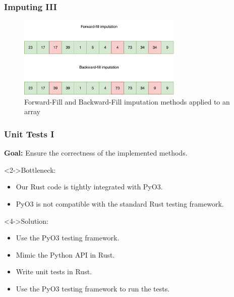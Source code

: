 \documentclass[t,english]{beamer}
\begin{document}
\begin{frame}
  \frametitle{Imputing III}
    \begin{figure}[H]
        \includegraphics[width=0.7\textwidth]{figures/imputing/imputation_2.png}
        \caption{Forward-Fill and Backward-Fill imputation methods applied to an array}
        \label{fig:imputing}
    \end{figure}
\end{frame}

\begin{frame}
  \frametitle{Unit Tests I}
  \textbf{Goal:} Ensure the correctness of the implemented methods.

  \begin{block}<2->{Bottleneck:}
    \begin{itemize}
      \item <2-> Our Rust code is tightly integrated with PyO3.
      \item <3-> PyO3 is not compatible with the standard Rust testing framework.
    \end{itemize}
  \end{block}

  \begin{block}<4->{Solution:}
    \begin{itemize}
      \item <4-> Use the PyO3 testing framework.
      \item <5-> Mimic the Python API in Rust.
      \item <6-> Write unit tests in Rust.
      \item <7-> Use the PyO3 testing framework to run the tests.
    \end{itemize}
  \end{block}

\end{frame}
\end{document}
